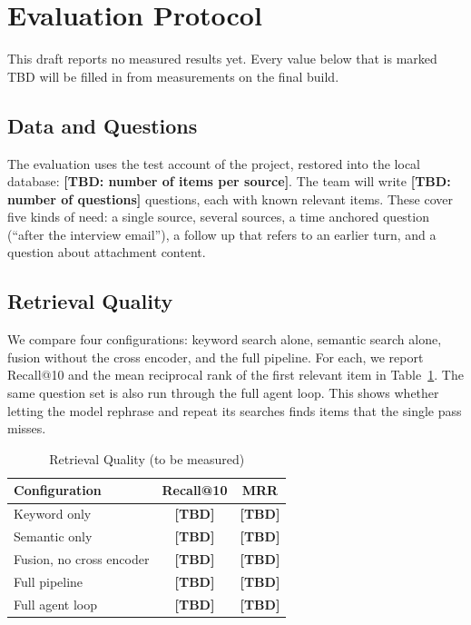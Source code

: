 \documentclass[conference]{IEEEtran}
\newcommand{\tbd}[1]{\textbf{[TBD: #1]}}
\begin{document}
\section{Evaluation Protocol}\label{sec:eval}
This draft reports no measured results yet. Every value below that is marked TBD will be filled in from measurements on the final build.

\subsection{Data and Questions}
The evaluation uses the test account of the project, restored into the local database: \tbd{number of items per source}. The team will write \tbd{number of questions} questions, each with known relevant items. These cover five kinds of need: a single source, several sources, a time anchored question (``after the interview email''), a follow up that refers to an earlier turn, and a question about attachment content.

\subsection{Retrieval Quality}
We compare four configurations: keyword search alone, semantic search alone, fusion without the cross encoder, and the full pipeline. For each, we report Recall@10 and the mean reciprocal rank of the first relevant item in Table~\ref{tab:results}. The same question set is also run through the full agent loop. This shows whether letting the model rephrase and repeat its searches finds items that the single pass misses.

\begin{table}[t]
\caption{Retrieval Quality (to be measured)}
\label{tab:results}
\centering
\renewcommand{\arraystretch}{1.15}
\begin{tabular}{|l|c|c|}
\hline
\textbf{Configuration} & \textbf{Recall@10} & \textbf{MRR} \\
\hline
Keyword only & \textbf{[TBD]} & \textbf{[TBD]} \\
\hline
Semantic only & \textbf{[TBD]} & \textbf{[TBD]} \\
\hline
Fusion, no cross encoder & \textbf{[TBD]} & \textbf{[TBD]} \\
\hline
Full pipeline & \textbf{[TBD]} & \textbf{[TBD]} \\
\hline
Full agent loop & \textbf{[TBD]} & \textbf{[TBD]} \\
\hline
\end{tabular}
\end{table}
\end{document}
